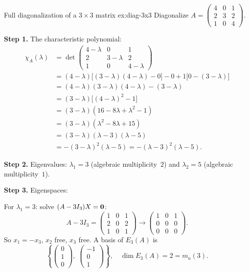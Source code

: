 \begin{example}{Full diagonalization of a $3\times 3$ matrix}%
{ex:diag-3x3}
Diagonalize $A = \begin{pmatrix} 4 & 0 & 1 \\ 2 & 3 & 2 \\ 1 & 0 & 4
\end{pmatrix}$.

\textbf{Step 1.}  The characteristic polynomial:
\begin{align*}
  \chi_A(\lambda) &= \det\begin{pmatrix} 4-\lambda & 0 & 1 \\
    2 & 3-\lambda & 2 \\ 1 & 0 & 4-\lambda \end{pmatrix} \\
  &= (4-\lambda)\bigl[(3-\lambda)(4-\lambda) - 0\bigr]
    - 0 + 1\bigl[0 - (3-\lambda)\bigr] \\
  &= (4-\lambda)(3-\lambda)(4-\lambda) - (3-\lambda) \\
  &= (3-\lambda)\bigl[(4-\lambda)^2 - 1\bigr] \\
  &= (3-\lambda)(16 - 8\lambda + \lambda^2 - 1) \\
  &= (3-\lambda)(\lambda^2 - 8\lambda + 15) \\
  &= (3-\lambda)(\lambda - 3)(\lambda - 5) \\
  &= -(3-\lambda)^2(\lambda - 5) = -(\lambda-3)^2(\lambda-5).
\end{align*}

\textbf{Step 2.}  Eigenvalues: $\lambda_1 = 3$ (algebraic
multiplicity~$2$) and $\lambda_2 = 5$ (algebraic multiplicity~$1$).

\textbf{Step 3.}  Eigenspaces:

For $\lambda_1 = 3$: solve $(A - 3I_3)X = \mathbf{0}$:
\[
  A - 3I_3 = \begin{pmatrix} 1 & 0 & 1 \\ 2 & 0 & 2 \\ 1 & 0 & 1
  \end{pmatrix} \longrightarrow \begin{pmatrix} 1 & 0 & 1 \\ 0 & 0 & 0
  \\ 0 & 0 & 0 \end{pmatrix}.
\]
So $x_1 = -x_3$, $x_2$ free, $x_3$ free.  A basis of $E_3(A)$ is
\[
  \left\{ \begin{pmatrix} 0\\1\\0 \end{pmatrix},\;
  \begin{pmatrix} -1\\0\\1 \end{pmatrix} \right\},
  \quad \dim E_3(A) = 2 = m_a(3).
\]


\end{example}
